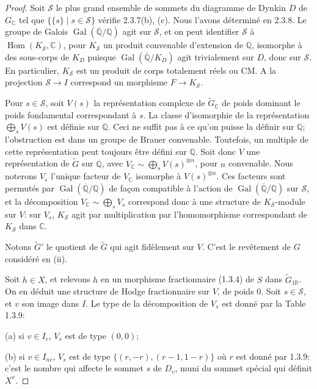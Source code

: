 \documentclass[12pt,a4paper]{article}
\theoremstyle{plain}
\theoremstyle{definition}
\theoremstyle{remark}
\DeclareMathOperator{\Hom}{Hom}
\DeclareMathOperator{\Gal}{Gal}
\newcommand{\QQ}{\mathbb{Q}}
\newcommand{\RR}{\mathbb{R}}
\newcommand{\CC}{\mathbb{C}}
\begin{document}
\begin{proof}
Soit $\mathcal{S}$ le plus grand ensemble de sommets du diagramme de Dynkin $D$ de $G_{\CC}$ tel que $\{\{s\} \mid s \in \mathcal{S}\}$ v\'erifie 2.3.7(b), (c). Nous l'avons d\'etermin\'e en 2.3.8. Le groupe de Galois $\Gal(\overline{\QQ}/\QQ)$ agit sur $\mathcal{S}$, et on peut identifier $\mathcal{S}$ \`a $\Hom(K_\mathcal{S},\CC)$, pour $K_\mathcal{S}$ un produit convenable d'extension de $\QQ$, isomorphe \`a des sous-corps de $K_D$ puisque $\Gal(\overline{\QQ}/K_D)$ agit trivialement sur $D$, donc sur $\mathcal{S}$. En particulier, $K_\mathcal{S}$ est un produit de corps totalement r\'eels ou CM. A la projection $\mathcal{S} \to I$ correspond un morphisme $F \to K_\mathcal{S}$.

Pour $s \in \mathcal{S}$, soit $V(s)$ la repr\'esentation complexe de $\tilde{G}_{\CC}$ de poids dominant le poids fondamental correspondant \`a $s$. La classe d'isomorphie de la repr\'esentation $\bigoplus_s V(s)$ est d\'efinie sur $\QQ$. Ceci ne suffit pas \`a ce qu'on puisse la d\'efinir sur $\QQ$; l'obstruction est dans un groupe de Brauer convenable. Toutefois, un multiple de cette repr\'esentation peut toujours \^etre d\'efini sur $\QQ$. Soit donc $V$ une repr\'esentation de $\tilde{G}$ sur $\QQ$, avec $V_{\CC} \sim \bigoplus_s V(s)^{\otimes n}$, pour $n$ convenable. Nous noterons $V_s$ l'unique facteur de $V_{\CC}$ isomorphe \`a $V(s)^{\otimes n}$. Ces facteurs sont permut\'es par $\Gal(\overline{\QQ}/\QQ)$ de fa\c{c}on compatible \`a l'action de $\Gal(\overline{\QQ}/\QQ)$ sur $\mathcal{S}$, et la d\'ecomposition $V_{\CC} \sim \bigoplus_s V_s$ correspond donc \`a une structure de $K_\mathcal{S}$-module sur $V$: sur $V_s$, $K_\mathcal{S}$ agit par multiplication par l'homomorphisme correspondant de $K_\mathcal{S}$ dans $\CC$.

Notons $\tilde{G}'$ le quotient de $\tilde{G}$ qui agit fid\`element sur $V$. C'est le rev\^etement de $G$ consid\'er\'e en (ii).

Soit $h \in X$, et relevons $h$ en un morphisme fractionnaire (1.3.4) de $S$ dans $\tilde{G}_{1\RR}$. On en d\'eduit une structure de Hodge fractionnaire sur $V$, de poids 0. Soit $s \in \mathcal{S}$, et $v$ son image dans $I$. Le type de la d\'ecomposition de $V_s$ est donn\'e par la Table 1.3.9:

(a) si $v \in I_c$, $V_s$ est de type $(0,0)$;

(b) si $v \in I_{nc}$, $V_s$ est de type $\{(r,-r), (r-1,1-r)\}$ o\`u $r$ est donn\'e par 1.3.9: c'est le nombre qui affecte le sommet $s$ de $D_v$, muni du sommet sp\'ecial qui d\'efinit $X^v$.


\end{proof}
\end{document}
